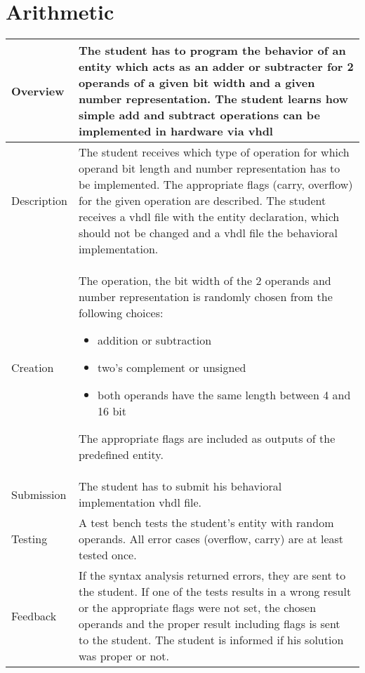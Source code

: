 \section{Arithmetic}\label{arithmetic}
    \begin{tabular}{|p{2cm}|p{11cm}|}
        \hline
        Overview & The student has to program the behavior of an entity which acts as an adder or subtracter
        for 2 operands of a given bit width and a given number representation. The student learns how simple
        add and subtract operations can be implemented in hardware via vhdl
        \\
        \hline
        Description & The student receives which type of operation for which operand bit length and number
        representation has to be implemented. The appropriate flags (carry, overflow) for the given
        operation are described. The student receives a vhdl file with the entity declaration,
        which should not be changed and a vhdl file the behavioral implementation.
        \\
        \hline
        Creation & The operation, the bit width of the 2 operands and number representation is randomly
        chosen from the following choices:
        \begin{itemize}
            \item addition or subtraction
            \item two's complement or unsigned
            \item both operands have the same length between 4 and 16 bit
        \end{itemize}
        The appropriate flags are included as outputs of the predefined entity.
        \\
        \hline
        Submission & The student has to submit his behavioral implementation vhdl file.
        \\
        \hline
        Testing & A test bench tests the student's entity with random operands. All error
        cases (overflow, carry) are at least tested once.
        \\
        \hline
        Feedback & If the syntax analysis returned errors, they are sent to the student. If one of the
        tests results in a wrong result or the appropriate flags were not set, the chosen operands
        and the proper result including flags is sent to the student. The student is informed if
        his solution was proper or not.
        \\
        \hline
    \end{tabular}


